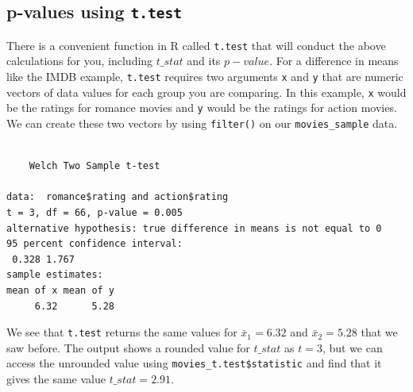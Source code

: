 \documentclass[
  letterpaper,
  DIV=11,
  numbers=noendperiod]{scrreprt}
\newenvironment{Shaded}{\begin{snugshade}}{\end{snugshade}}
\newcommand{\AttributeTok}[1]{\textcolor[rgb]{0.40,0.45,0.13}{#1}}
\newcommand{\FunctionTok}[1]{\textcolor[rgb]{0.28,0.35,0.67}{#1}}
\newcommand{\NormalTok}[1]{\textcolor[rgb]{0.00,0.23,0.31}{#1}}
\newcommand{\OtherTok}[1]{\textcolor[rgb]{0.00,0.23,0.31}{#1}}
\newcommand{\SpecialCharTok}[1]{\textcolor[rgb]{0.37,0.37,0.37}{#1}}
\newcommand{\StringTok}[1]{\textcolor[rgb]{0.13,0.47,0.30}{#1}}
\theoremstyle{definition}
\theoremstyle{remark}
\begin{document}
\hypertarget{sec-t-test}{%
\subsection{\texorpdfstring{p-values using
\texttt{t.test}}{p-values using t.test}}\label{sec-t-test}}

There is a convenient function in R called \texttt{t.test} that will
conduct the above calculations for you, including \(t\_stat\) and its
\(p-value\). For a difference in means like the IMDB example,
\texttt{t.test} requires two arguments \texttt{x} and \texttt{y} that
are numeric vectors of data values for each group you are comparing. In
this example, \texttt{x} would be the ratings for romance movies and
\texttt{y} would be the ratings for action movies. We can create these
two vectors by using \texttt{filter()} on our \texttt{movies\_sample}
data.

\begin{Shaded}
\end{Shaded}

\begin{verbatim}

    Welch Two Sample t-test

data:  romance$rating and action$rating
t = 3, df = 66, p-value = 0.005
alternative hypothesis: true difference in means is not equal to 0
95 percent confidence interval:
 0.328 1.767
sample estimates:
mean of x mean of y 
     6.32      5.28 
\end{verbatim}

We see that \texttt{t.test} returns the same values for
\(\bar{x}_1 = 6.32\) and \(\bar{x}_2 = 5.28\) that we saw before. The
output shows a rounded value for \(t\_stat\) as \(t = 3\), but we can
access the unrounded value using \texttt{movies\_t.test\$statistic} and
find that it gives the same value \(t\_stat = 2.91\).
\end{document}
